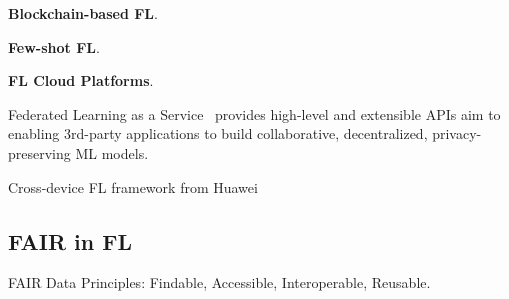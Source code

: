 \textbf{Blockchain-based FL}.

\textbf{Few-shot FL}.

\textbf{FL Cloud Platforms}.

Federated Learning as a Service~\cite{kourtellis2020flaas} provides high-level and extensible APIs aim to enabling 3rd-party applications to build collaborative, decentralized, privacy-preserving ML models.

Cross-device FL framework from Huawei~\cite{zhang2022felicitas}

\subsection{FAIR in FL}
FAIR Data Principles: Findable, Accessible, Interoperable, Reusable.


\begin{comment}
    ssssdd

\end{comment}